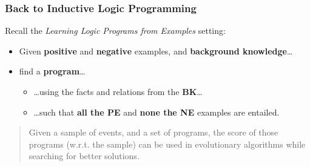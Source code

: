 \documentclass[bigger,xcolor={x11names,svgnames}]{beamer}
\begin{document}
%
\begin{frame}
    \frametitle{Back to Inductive Logic Programming}
    \vfill
    Recall the \emph{Learning Logic Programs from Examples} setting:
    \begin{itemize}
        \item Given \textbf{positive} and \textbf{negative} examples, and \textbf{background knowledge}\ldots
        \item find a \textbf{program}\ldots
              \begin{itemize}
                  \item \ldots using the facts and relations from the \textbf{BK}\ldots
                  \item \ldots such that \textbf{all the PE} and \textbf{none the NE} examples are entailed.
              \end{itemize}
    \end{itemize}
    \vfill
    \begin{quotation}
        Given a sample of events, and a set of programs, \alert{the score} of those programs (w.r.t. the sample) \alert{can be used in evolutionary algorithms} while searching for better solutions.
    \end{quotation}
\end{frame}
%
%
\end{document}
